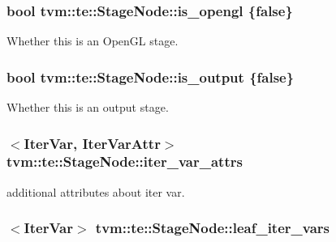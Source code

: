 \subsubsection[{\texorpdfstring{is\+\_\+opengl}{is_opengl}}]{\setlength{\rightskip}{0pt plus 5cm}bool tvm\+::te\+::\+Stage\+Node\+::is\+\_\+opengl \{false\}}\hypertarget{classtvm_1_1te_1_1StageNode_a1c4533e83d0b9ae647f5f4dcd15e4208}{}\label{classtvm_1_1te_1_1StageNode_a1c4533e83d0b9ae647f5f4dcd15e4208}


Whether this is an Open\+GL stage. 

\subsubsection[{\texorpdfstring{is\+\_\+output}{is_output}}]{\setlength{\rightskip}{0pt plus 5cm}bool tvm\+::te\+::\+Stage\+Node\+::is\+\_\+output \{false\}}\hypertarget{classtvm_1_1te_1_1StageNode_af5cc9e6c2276cf8abde8f437f8bdbda4}{}\label{classtvm_1_1te_1_1StageNode_af5cc9e6c2276cf8abde8f437f8bdbda4}


Whether this is an output stage. 

\subsubsection[{\texorpdfstring{iter\+\_\+var\+\_\+attrs}{iter_var_attrs}}]{$<${\bf Iter\+Var}, {\bf Iter\+Var\+Attr}$>$ tvm\+::te\+::\+Stage\+Node\+::iter\+\_\+var\+\_\+attrs}\hypertarget{classtvm_1_1te_1_1StageNode_a1d1f5c5e99f0c0c5d09a497b5c05443f}{}\label{classtvm_1_1te_1_1StageNode_a1d1f5c5e99f0c0c5d09a497b5c05443f}


additional attributes about iter var. 

\subsubsection[{\texorpdfstring{leaf\+\_\+iter\+\_\+vars}{leaf_iter_vars}}]{$<${\bf Iter\+Var}$>$ tvm\+::te\+::\+Stage\+Node\+::leaf\+\_\+iter\+\_\+vars}\hypertarget{classtvm_1_1te_1_1StageNode_a80162bcc647f01efa9ab97da3ca57410}{}\label{classtvm_1_1te_1_1StageNode_a80162bcc647f01efa9ab97da3ca57410}


